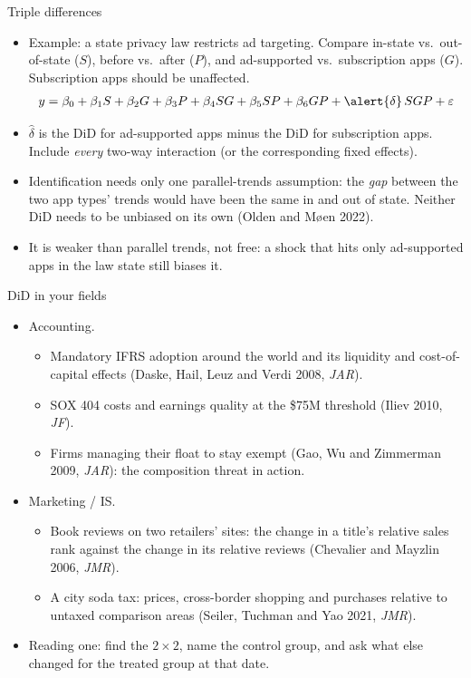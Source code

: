\documentclass[aspectratio=169,11pt]{beamer}
\begin{document}
\begin{frame}{Triple differences}
\begin{itemize}
	\item Example: a state privacy law restricts ad targeting. Compare in-state vs.\ out-of-state ($S$),
	before vs.\ after ($P$), and ad-supported vs.\ subscription apps ($G$). Subscription apps should be unaffected.
	\begin{align*}
		y = \beta_0 + \beta_1 S + \beta_2 G + \beta_3 P + \beta_4 SG + \beta_5 SP + \beta_6 GP + \alert{\delta}\, SGP + \varepsilon
	\end{align*}
	\item $\hat\delta$ is the DiD for ad-supported apps minus the DiD for subscription apps. Include \emph{every}
	two-way interaction (or the corresponding fixed effects).
	\medskip
	\item Identification needs only one parallel-trends assumption: the \emph{gap} between the two app types'
	trends would have been the same in and out of state. Neither DiD needs to be unbiased on its own
	(Olden and M{\o}en 2022).
	\medskip
	\item It is weaker than parallel trends, not free: a shock that hits only ad-supported apps in the law
	state still biases it.
\end{itemize}
\end{frame}


\begin{frame}{DiD in your fields}
\small
\begin{itemize}
	\item \alert{Accounting.}
	\begin{itemize}
		\item Mandatory IFRS adoption around the world and its liquidity and cost-of-capital effects
		(Daske, Hail, Leuz and Verdi 2008, \emph{JAR}).
		\item SOX 404 costs and earnings quality at the \$75M threshold (Iliev 2010, \emph{JF}).
		\item Firms managing their float to stay exempt (Gao, Wu and Zimmerman 2009, \emph{JAR}): the composition
		threat in action.
	\end{itemize}
	\item \alert{Marketing / IS.}
	\begin{itemize}
		\item Book reviews on two retailers' sites: the change in a title's relative sales rank against the change in
		its relative reviews (Chevalier and Mayzlin 2006, \emph{JMR}).
		\item A city soda tax: prices, cross-border shopping and purchases relative to untaxed comparison areas
		(Seiler, Tuchman and Yao 2021, \emph{JMR}).
	\end{itemize}
	\item Reading one: find the $2\times2$, name the control group, and ask what else changed for the treated group
	at that date.
\end{itemize}
\end{frame}
\end{document}
